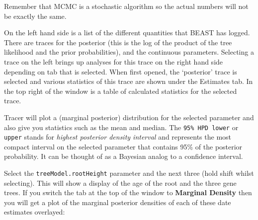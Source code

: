 \documentclass[12pt]{article}
\begin{document}
\medskip{}

Remember that MCMC is a stochastic algorithm so the actual numbers will not be exactly the same.

On the left hand side is a list of the different quantities that BEAST has logged. There are traces for the posterior (this
is the log of the product of the tree likelihood and the prior probabilities), and the continuous parameters. Selecting a trace
on the left brings up analyses for this trace on the right hand side depending on tab that is selected. When first opened, the
`posterior' trace is selected and various statistics of this trace are shown under the Estimates tab.
In the top right of the window is a table of calculated statistics for the selected trace. 

Tracer will plot a (marginal posterior) distribution for the selected parameter and also give you statistics such as the mean and median. The \texttt{95\% HPD lower} or \texttt {upper} stands for {\it highest posterior density interval} and represents the most compact interval on the selected parameter that contains 95\% of the posterior probability. It can be thought of as a Bayesian analog to a confidence interval. 

Select the \texttt{treeModel.rootHeight} parameter and the next three (hold shift whilst selecting). This will show a display of the
age of the root and the three gene trees. If you switch the tab at the top of the window to {\bf Marginal Density} then you will get a plot of the marginal posterior densities of each of these date estimates overlayed:

\medskip{}

\end{document}
